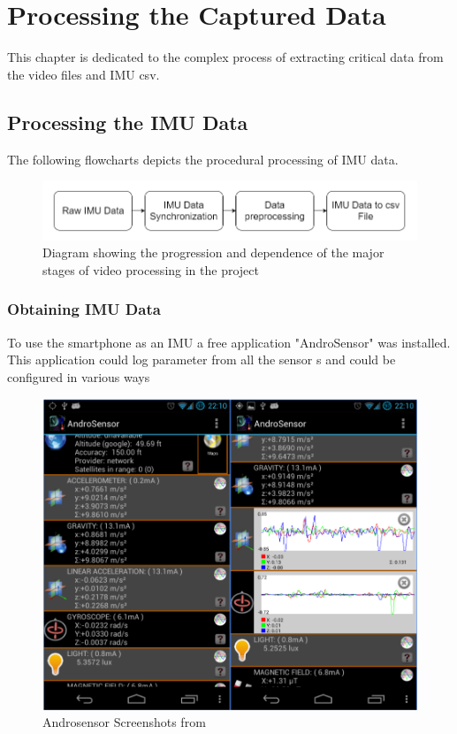 \chapter{Processing the Captured Data}
This chapter is dedicated to the complex process of extracting critical data from the video files and IMU csv. 

\section{Processing the IMU Data}
The following flowcharts depicts the procedural processing of IMU data.
\begin{figure}[!ht]
  \includegraphics[width=\linewidth]{figures/imuflow.png}
  \caption{Diagram showing the progression and dependence of the major stages of video processing in the project}
  \label{fig:imuflow}
\end{figure}

\subsection{Obtaining IMU Data}
To use the smartphone as an IMU a free application "AndroSensor" \cite{androsensor} was installed. This application could log parameter from all the  sensor s and could be configured in various ways

\begin{figure}[!ht] 
\captionsetup{width=\linewidth, font=small}  
\includegraphics[width=\linewidth]{figures/as.png}
\caption{Androsensor Screenshots from \cite{androsensor}}
\label{fig:as}
\end{figure}

